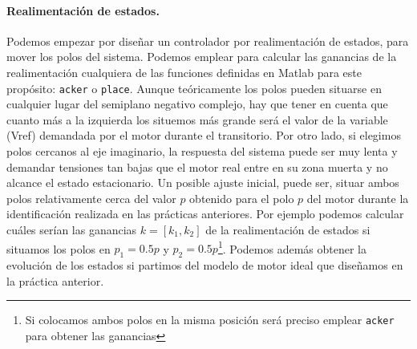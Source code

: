 \documentclass[10pt,a4paper]{report}
\begin{document}
\paragraph{Realimentación de estados.} Podemos empezar por diseñar un controlador por realimentación de estados, para mover los polos del sistema.  Podemos emplear para calcular las ganancias de la realimentación cualquiera de las funciones definidas en Matlab para este propósito: \texttt{acker} o \texttt{place}. Aunque teóricamente los polos pueden situarse en cualquier lugar del semiplano negativo complejo, hay que tener en cuenta que cuanto más a la izquierda los situemos más grande será el valor de la variable (Vref) demandada por el motor durante el transitorio. Por otro lado, si elegimos polos cercanos al eje imaginario, la respuesta del sistema puede ser muy lenta  y demandar tensiones tan bajas que el motor real entre en su zona muerta y no alcance el estado estacionario. Un posible ajuste inicial, puede ser, situar ambos polos relativamente cerca del valor $p$ obtenido para el polo $p$ del motor durante la identificación realizada en las prácticas anteriores. Por ejemplo podemos calcular cuáles serían las ganancias $k = [k_1, k_2]$ de la realimentación de estados si situamos los polos en $p_1 = 0.5p$ y $p_2 = 0.5p$\footnote{Si colocamos ambos polos en la misma posición será preciso emplear \texttt{acker} para obtener las ganancias}. Podemos además obtener la evolución de los estados si partimos del modelo de motor ideal que diseñamos en la práctica anterior.  
\end{document}
